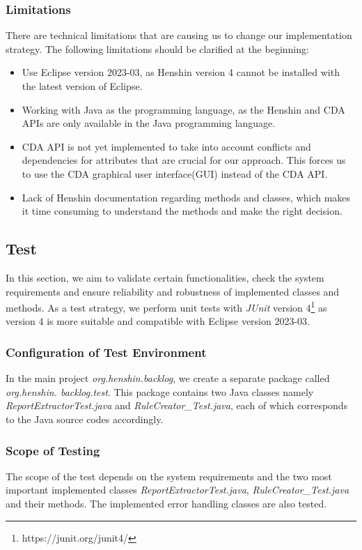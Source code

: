 \subsubsection*{Limitations}
There are technical limitations that are causing us to change our implementation strategy.
The following limitations should be clarified at the beginning:
\begin{itemize}
	\item Use Eclipse version 2023-03, as Henshin version 4 cannot be installed with the latest version of Eclipse.
	
	\item Working with Java as the programming language, as the Henshin and CDA APIs are only available in the Java programming language.
	
	\item CDA API is not yet implemented to take into account conflicts and dependencies for attributes that are crucial for our approach. This forces us to use the CDA graphical user interface(GUI) instead of the CDA API.
	
	\item Lack of Henshin documentation regarding methods and classes, which makes it time consuming to understand the methods and make the right decision.
\end{itemize}
\subsection{Test}\label{redundancy_test}
In this section, we aim to validate certain functionalities, check the system requirements and ensure reliability and robustness of implemented classes and methods. As a test strategy, we perform unit tests with \textit{JUnit} version 4\footnote{https://junit.org/junit4/} as version 4 is more suitable and compatible with Eclipse version 2023-03.
\subsubsection*{Configuration of Test Environment}
In the main project \textit{org.henshin.backlog}, we create a separate package called \textit{org.henshin. backlog.test}. This package contains two Java classes namely \textit{ReportExtractorTest.java} and \textit{RuleCreator\_Test.java}, each of which corresponds to the Java source codes accordingly.
\subsubsection*{Scope of Testing}
The scope of the test depends on the system requirements and the two most important implemented classes \textit{ReportExtractorTest.java}, \textit{RuleCreator\_Test.java} and their methods. The implemented error handling classes are also tested.

